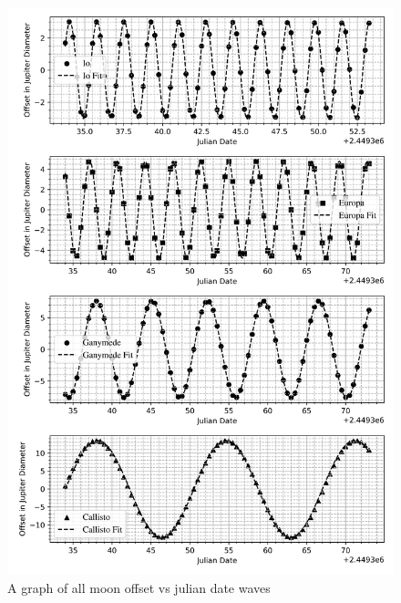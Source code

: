 \documentclass[12pt, a4paper]{article}
\begin{document}
\begin{figure}[H]
    \centering
    \includegraphics[width = \textwidth]{4Plot1.png}
    \caption{A graph of all moon offset vs julian date waves}
\end{figure}
\end{document}
